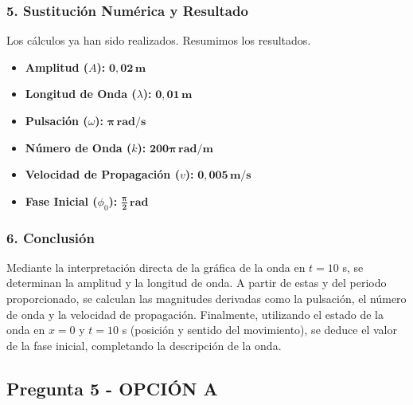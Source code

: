 \subsubsection*{5. Sustitución Numérica y Resultado}
Los cálculos ya han sido realizados. Resumimos los resultados.
\begin{cajaresultado}
\begin{itemize}
    \item \textbf{Amplitud ($A$):} $\boldsymbol{0,02 \, \textbf{m}}$
    \item \textbf{Longitud de Onda ($\lambda$):} $\boldsymbol{0,01 \, \textbf{m}}$
    \item \textbf{Pulsación ($\omega$):} $\boldsymbol{\pi \, \textbf{rad/s}}$
    \item \textbf{Número de Onda ($k$):} $\boldsymbol{200\pi \, \textbf{rad/m}}$
    \item \textbf{Velocidad de Propagación ($v$):} $\boldsymbol{0,005 \, \textbf{m/s}}$
    \item \textbf{Fase Inicial ($\phi_0$):} $\boldsymbol{\frac{\pi}{2} \, \textbf{rad}}$
\end{itemize}
\end{cajaresultado}

\subsubsection*{6. Conclusión}
\begin{cajaconclusion}
    Mediante la interpretación directa de la gráfica de la onda en $t=10$ s, se determinan la amplitud y la longitud de onda. A partir de estas y del periodo proporcionado, se calculan las magnitudes derivadas como la pulsación, el número de onda y la velocidad de propagación. Finalmente, utilizando el estado de la onda en $x=0$ y $t=10$ s (posición y sentido del movimiento), se deduce el valor de la fase inicial, completando la descripción de la onda.
\end{cajaconclusion}

\newpage
\subsection{Pregunta 5 - OPCIÓN A}
\label{subsec:5A_2025_jul_ext}

